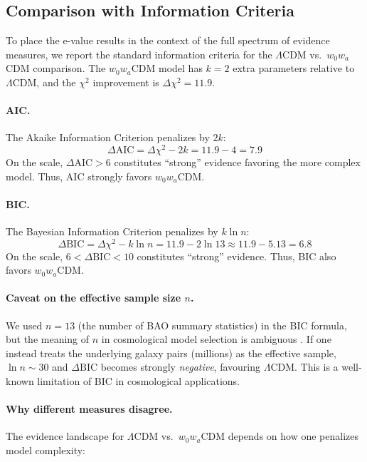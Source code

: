 \documentclass[11pt,a4paper]{article}
\newcommand{\LCDM}{$\Lambda$CDM}
\begin{document}
\subsection{Comparison with Information Criteria}
\label{sec:infocriteria}

To place the e-value results in the context of the full spectrum of evidence measures, we report the standard information criteria for the \LCDM{} vs.\ $w_0w_a$CDM comparison. The $w_0w_a$CDM model has $k = 2$ extra parameters relative to \LCDM, and the $\chi^2$ improvement is $\Delta\chi^2 = 11.9$.

\paragraph{AIC.} The Akaike Information Criterion \citep{BurnhamAnderson2002} penalizes by $2k$:
\begin{equation}
\Delta\text{AIC} = \Delta\chi^2 - 2k = 11.9 - 4 = 7.9
\end{equation}
On the \citet{BurnhamAnderson2002} scale, $\Delta\text{AIC} > 6$ constitutes ``strong'' evidence favoring the more complex model. Thus, AIC strongly favors $w_0w_a$CDM.

\paragraph{BIC.} The Bayesian Information Criterion \citep{Schwarz1978} penalizes by $k \ln n$:
\begin{equation}
\Delta\text{BIC} = \Delta\chi^2 - k \ln n = 11.9 - 2 \ln 13 \approx 11.9 - 5.13 = 6.8
\end{equation}
On the \citet{KassRaftery1995} scale, $6 < \Delta\text{BIC} < 10$ constitutes ``strong'' evidence. Thus, BIC also favors $w_0w_a$CDM.

\paragraph{Caveat on the effective sample size $n$.} We used $n = 13$ (the number of BAO summary statistics) in the BIC formula, but the meaning of $n$ in cosmological model selection is ambiguous \citep{Liddle2007}. If one instead treats the underlying galaxy pairs (millions) as the effective sample, $\ln n \sim 30$ and $\Delta\text{BIC}$ becomes strongly \textit{negative}, favouring \LCDM. This is a well-known limitation of BIC in cosmological applications.

\paragraph{Why different measures disagree.} The evidence landscape for \LCDM{} vs.\ $w_0w_a$CDM depends on how one penalizes model complexity:
\end{document}
